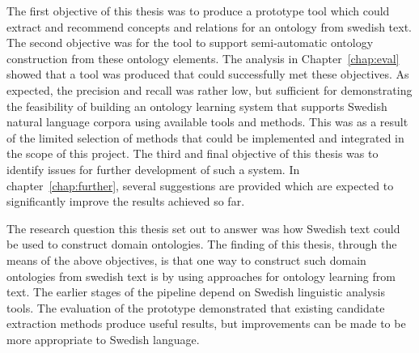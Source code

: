 \documentclass[a4paper]{report}
\begin{document}
The first objective of this thesis was to produce a prototype tool which could extract and recommend concepts and relations for an ontology from swedish text.
The second objective was for the tool to support semi-automatic ontology construction from these ontology elements.
The analysis in Chapter~\ref{chap:eval} showed that a tool was produced that could successfully met these objectives.
As expected, the precision and recall was rather low, but sufficient for demonstrating the feasibility of building an ontology learning system that supports Swedish natural language corpora using available tools and methods.
This was as a result of the limited selection of methods that could be implemented and integrated in the scope of this project.
The third and final objective of this thesis was to identify issues for further development of such a system.
In chapter~\ref{chap:further}, several suggestions are provided which are expected to significantly improve the results achieved so far.

The research question this thesis set out to answer was how Swedish text could be used to construct domain ontologies.
The finding of this thesis, through the means of the above objectives, is that one way to construct such domain ontologies from swedish text is by using approaches for ontology learning from text.
The earlier stages of the pipeline depend on Swedish linguistic analysis tools.
The evaluation of the prototype demonstrated that existing candidate extraction methods produce useful results, but improvements can be made to be more appropriate to Swedish language.

\clearpage



\end{document}
